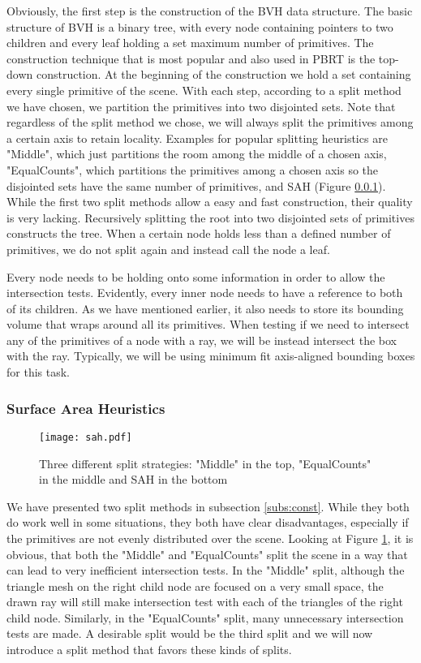 Obviously, the first step is the construction of the BVH data structure. The basic structure of BVH is a binary tree, with every node containing pointers to two children and every leaf holding a set maximum number of primitives. The construction technique that is most popular and also used in PBRT is the top-down construction. At the beginning of the construction we hold a set containing every single primitive of the scene. With each step, according to a split method we have chosen, we partition the primitives into two disjointed sets. Note that regardless of the split method we chose, we will always split the primitives among a certain axis to retain locality. Examples for popular splitting heuristics are "Middle", which just partitions the room among the middle of a chosen axis, "EqualCounts", which partitions the primitives among a chosen axis so the disjointed sets have the same number of primitives, and SAH (Figure \ref{pre:sah}). While the first two split methods allow a easy and fast construction, their quality is very lacking. Recursively splitting the root into two disjointed sets of primitives constructs the tree. When a certain node holds less than a defined number of primitives, we do not split again and instead call the node a leaf.

Every node needs to be holding onto some information in order to allow the intersection tests. Evidently, every inner node needs to have a reference to both of its children. As we have mentioned earlier, it also needs to store its bounding volume that wraps around all its primitives. When testing if we need to intersect any of the primitives of a node with a ray, we will be instead intersect the box with the ray. Typically, we will be using minimum fit axis-aligned bounding boxes for this task.

\subsubsection{Surface Area Heuristics}
\label{pre:sah}

\begin{figure}
	\begin{center}
		\texttt{[image: sah.pdf]}
		\caption{Three different split strategies: "Middle" in the top, "EqualCounts" in the middle and SAH in the bottom}
		\label{fig:sah}
	\end{center}
\end{figure}


We have presented two split methods in subsection \ref{subs:const}. While they both do work well in some situations, they both have clear disadvantages, especially if the primitives are not evenly distributed over the scene. Looking at Figure \ref{fig:sah}, it is obvious, that both the "Middle" and "EqualCounts" split the scene in a way that can lead to very inefficient intersection tests. In the "Middle" split, although the triangle mesh on the right child node are focused on a very small space, the drawn ray will still make intersection test with each of the triangles of the right child node. Similarly, in the "EqualCounts" split, many unnecessary intersection tests are made. A desirable split would be the third split and we will now introduce a split method that favors these kinds of splits.

